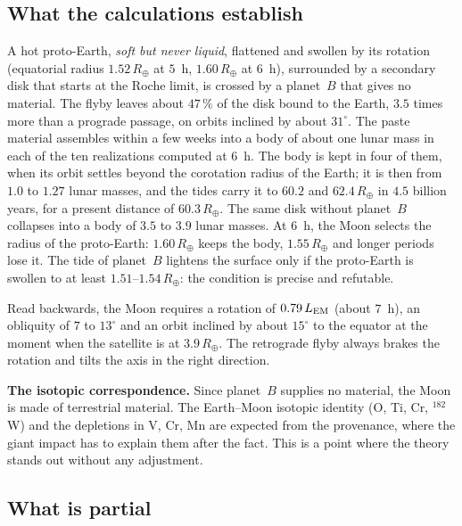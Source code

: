 \documentclass[11pt,a4paper]{article}
\newcommand{\Rt}{\ensuremath{R_\oplus}}
\newcommand{\LEM}{\ensuremath{L_{\rm EM}}}
\begin{document}
\subsection*{What the calculations establish}

A hot proto-Earth, \emph{soft but never liquid}, flattened and swollen by its rotation (equatorial radius $1.52\,\Rt$ at $5$~h, $1.60\,\Rt$ at $6$~h), surrounded by a secondary disk that starts at the Roche limit, is crossed by a planet~$B$ that gives no material. The flyby leaves about $47\,\%$ of the disk bound to the Earth, $3.5$ times more than a prograde passage, on orbits inclined by about $31^\circ$. The paste material assembles within a few weeks into a body of about one lunar mass in each of the ten realizations computed at $6$~h. The body is kept in four of them, when its orbit settles beyond the corotation radius of the Earth; it is then from $1.0$ to $1.27$ lunar masses, and the tides carry it to $60.2$ and $62.4\,\Rt$ in $4.5$ billion years, for a present distance of $60.3\,\Rt$. The same disk without planet~$B$ collapses into a body of $3.5$ to $3.9$ lunar masses. At $6$~h, the Moon selects the radius of the proto-Earth: $1.60\,\Rt$ keeps the body, $1.55\,\Rt$ and longer periods lose it. The tide of planet~$B$ lightens the surface only if the proto-Earth is swollen to at least $1.51$--$1.54\,\Rt$: the condition is precise and refutable.

Read backwards, the Moon requires a rotation of $0.79\,\LEM$ (about $7$~h), an obliquity of $7$ to $13^\circ$ and an orbit inclined by about $15^\circ$ to the equator at the moment when the satellite is at $3.9\,\Rt$. The retrograde flyby always brakes the rotation and tilts the axis in the right direction.

\textbf{The isotopic correspondence.} Since planet~$B$ supplies no material, the Moon is made of terrestrial material. The Earth--Moon isotopic identity (O, Ti, Cr, $^{182}$W) and the depletions in V, Cr, Mn are expected from the provenance, where the giant impact has to explain them after the fact. This is a point where the theory stands out without any adjustment.

\subsection*{What is partial}
\end{document}
